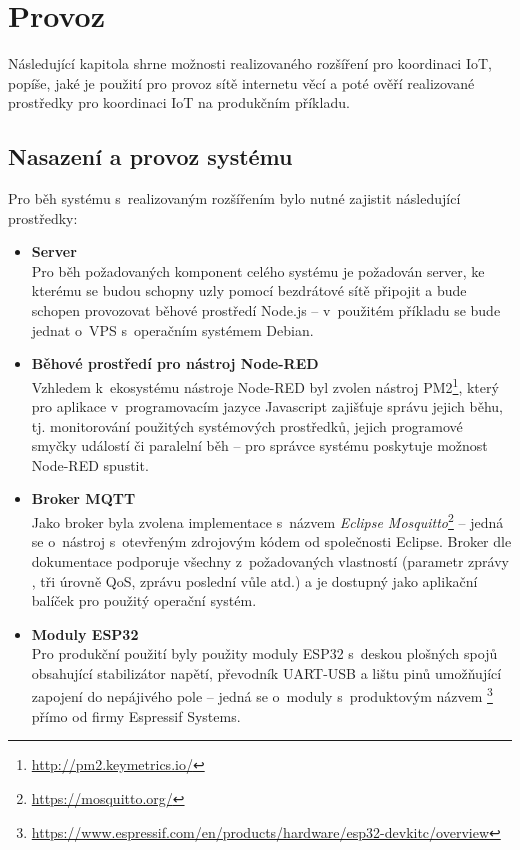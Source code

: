 \chapter{Provoz}
\label{ch:provoz}

Následující kapitola shrne možnosti realizovaného rozšíření pro koordinaci IoT, popíše, jaké je použití pro provoz
sítě internetu věcí a poté ověří realizované prostředky pro koordinaci IoT na produkčním příkladu.

\section{Nasazení a provoz systému}\label{sec:nasazení-a-provoz-systému}
Pro běh systému s~realizovaným rozšířením bylo nutné zajistit následující prostředky:
\begin{itemize}
    \item \textbf{Server} \\
    Pro běh požadovaných komponent celého systému je požadován server, ke kterému se budou schopny uzly pomocí
    bezdrátové sítě připojit a bude schopen provozovat běhové prostředí Node.js -- v~použitém příkladu se bude jednat
    o~VPS s~operačním systémem Debian.

    \item \textbf{Běhové prostředí pro nástroj Node-RED} \\
    Vzhledem k~ekosystému nástroje Node-RED byl zvolen nástroj PM2\footnote{\url{http://pm2.keymetrics.io/}}, který pro
    aplikace v~programovacím jazyce Javascript zajišťuje správu jejich běhu, tj. monitorování použitých systémových
    prostředků, jejich programové smyčky událostí či paralelní běh -- pro správce systému poskytuje možnost Node-RED
    spustit.

    \item \textbf{Broker MQTT} \\
    Jako broker byla zvolena implementace s~názvem \emph{Eclipse Mosquitto}\footnote{\url{https://mosquitto.org/}} --
    jedná se o~nástroj s~otevřeným zdrojovým kódem od společnosti Eclipse.
    Broker dle dokumentace podporuje všechny z~požadovaných vlastností (parametr zprávy , tři úrovně QoS,
    zprávu poslední vůle atd.) a je dostupný jako aplikační balíček pro použitý operační systém.

    \item \textbf{Moduly ESP32} \\
    Pro produkční použití byly použity moduly ESP32 s~deskou plošných spojů obsahující stabilizátor napětí, převodník
    UART-USB a lištu pinů umožňující zapojení do nepájivého pole -- jedná se o~moduly s~produktovým názvem
    \footnote{\url{https://www.espressif.com/en/products/hardware/esp32-devkitc/overview}}
    přímo od firmy Espressif Systems.
\end{itemize}

